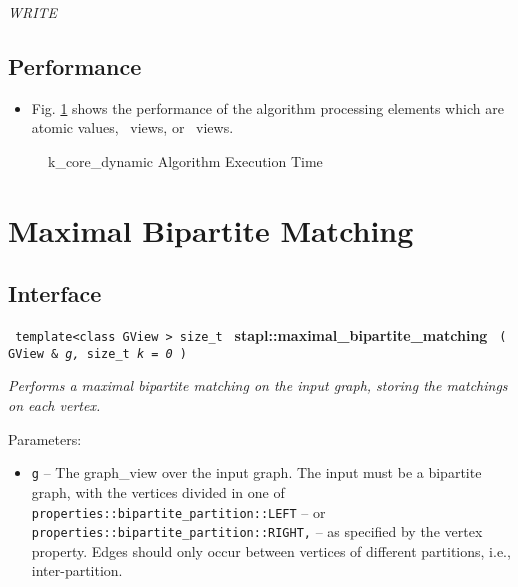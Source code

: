 \textit{WRITE}

\subsection{Performance} \label{sec-k-core-dyn-alg-perf}

\begin{itemize}
\item
Fig. \ref{fig:k-core-dyn-alg-exec-exper}
shows the performance of the algorithm processing
elements which are atomic values, \stl\ views, or \stapl\ views.
\end{itemize}

\begin{figure}[p]
\caption{ k\_core\_dynamic Algorithm Execution Time}
\label{fig:k-core-dyn-alg-exec-exper}
\end{figure}


\section{ Maximal Bipartite Matching}
\label{sec-max-bi-match-alg}

\subsection{Interface} \label{sec-max-bi-match-alg-inter}

\noindent
\texttt{%
template<class GView >
\newline
size\_t 
}
\newline
\textbf{stapl::maximal\_bipartite\_matching}%
\newline
\texttt{%
(
GView \&
\textit{g,}%
size\_t
\textit{k = 0}%
)     
}
\vspace{0.4cm}

\textit{
Performs a maximal bipartite matching on the input graph, storing the matchings on each vertex.
}
\vspace{0.4cm}

Parameters:
\begin{itemize}
\item
\texttt{g} --
The graph\_view over the input graph. The input must be a bipartite graph, with the vertices divided in one of 
\texttt{properties::bipartite\_partition::LEFT} --
or
\texttt{properties::bipartite\_partition::RIGHT,} --
as specified by the vertex property. Edges should only occur between vertices of different partitions, i.e., inter-partition.
\end{itemize}

